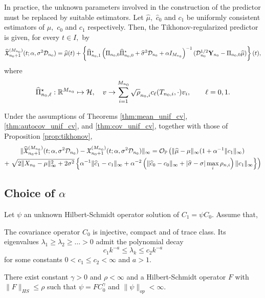 \documentclass{article}
\begin{document}
\color{purple}
In practice, the unknown parameters involved in the construction of the predictor must be replaced by suitable estimators.
Let $\widehat{\mu},$ $\widehat{c}_0$ and $c_1$ be uniformly consistent estimators of $\mu,$ $c_0$ and $c_1$ respectively. 
Then, the Tikhonov-regularized predictor is given, for every $t\in I,$ by
$$
\widehat{\mathfrak{X}}^{(M_{n_0})}_{n_0+1}(t;\alpha,\sigma^2 \mathcal{D}_{n_0} )= \widehat\mu(t) + \left\{\widehat\Pi_{n_0,1}^\star \left( \Pi_{n_0,0}\widehat\Pi_{n_0,0}^\star 
	+  \widehat\sigma^2  \mathcal{D}_{n_0} +\alpha  I_{M_{n_0}}	\right)^{-1}( \mathcal{D}_{n_0}^{1/2}\mathbf{Y}_{n_0}-\Pi_{n_0,0}\widehat\mu)\right\}(t),
$$ 
where 
$$
\widehat\Pi_{n_0,\ell}^\star : \mathbb{R}^{M_{n_0}}\mapsto\mathcal{H},\quad v\rightarrow \sum_{i=1}^{M_{n_0}} \sqrt\rho_{n_0,i} c_\ell(T_{n_0,i},\cdot) v_i,\qquad \ell=0,1.
$$
\begin{proposition}\label{prop:unif:conv}
Under the assumptions of Theorems \ref{thm:mean_unif_cv}, \ref{thm:autocov_unif_cv}, and \ref{thm:cov_unif_cv}, together with those of Proposition \ref{prop:tikhonov},
\begin{multline*}
\|\widehat{\mathfrak{X}}^{(M_{n_0})}_{n_0+1}(t;\alpha,\sigma^2 \mathcal{D}_{n_0} )-{\mathfrak{X}}^{(M_{n_0})}_{n_0+1}(t;\alpha,\sigma^2 \mathcal{D}_{n_0} )\|_\infty=\mathcal{O}_{\mathbb{P}}\left(\|\widehat{\mu}-\mu\|_\infty(1+\alpha^{-1}\|c_1\|_\infty)\right.\\ 
+ \left.\sqrt{2\|X_{n_0}-\mu\|_\infty^2 +2\sigma^2}\left\{\alpha^{-1}\|\widehat{c}_1-c_1\|_{\infty}+\alpha^{-2}\left(\|\widehat{c}_0-c_0\|_\infty + |\widehat{\sigma}-\sigma| \max_{i}\rho_{n,i}  \right)\|c_1\|_\infty \right\}\right)
\end{multline*}
\end{proposition}

\subsection{Choice of $\alpha$}
Let $\psi$ an unknown Hilbert-Schmidt operator solution of $C_1=\psi C_0.$
Assume that,
\begin{assumptionH}
	\item   \label{H:C0} The covariance operator $C_0$ is injective, compact and of trace class. Its eigenvalues $\lambda_1\geq\lambda_2\geq\ldots >0$ admit the polynomial decay
	$$ c_1 k^{-a}\leq\lambda_k\leq c_2k^{-a}$$
	for some constants $0<c_1\leq c_2<\infty$ and $a>1.$
	
	\item\label{H:source}  There exist constant $\gamma>0$ and $\rho<\infty$ and a Hilbert-Schmidt operator $F$ with $\| F\|_{HS}\leq \rho$ such that $\psi=F C_0^\gamma$ and $\|\psi\|_{op}<\infty.$

\end{assumptionH}
\end{document}
